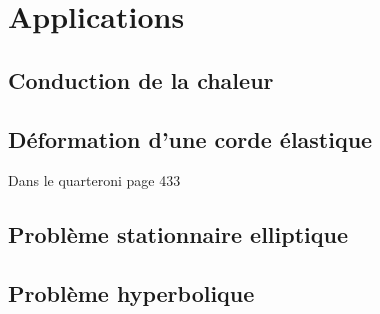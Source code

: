 \documentclass[12pt]{article}
\begin{document}
\section{Applications}

\subsection{Conduction de la chaleur}

\subsection{Déformation d'une corde élastique}
Dans le quarteroni page 433

\subsection{Problème stationnaire elliptique}

\subsection{Problème hyperbolique}
\end{document}
